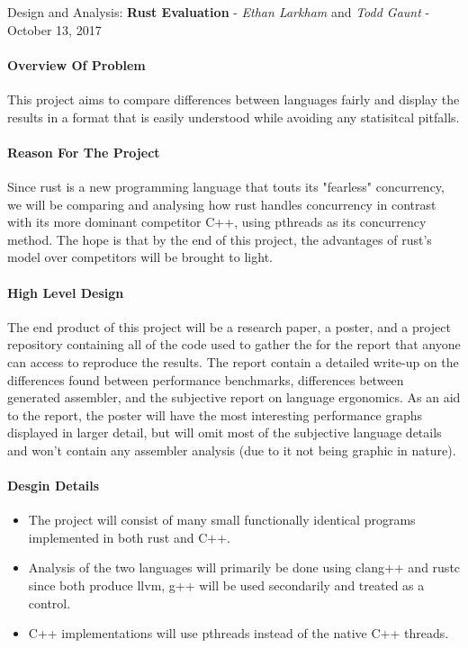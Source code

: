 \documentclass[10pt,a4paper]{report}
\begin{document}
\begin{center}
	{\Large Design and Analysis: {\bfseries Rust Evaluation}}
	- {\large{\itshape Ethan Larkham} and {\itshape Todd Gaunt}}
	- {\large October 13, 2017}
\end{center}
\vspace{0.5em}
\paragraph{Overview Of Problem}
This project aims to compare differences between languages fairly
and display the results in a format that is easily understood while avoiding
any statisitcal pitfalls.
\paragraph{Reason For The Project}
Since rust is a new programming language that touts its "fearless" concurrency,
we will be comparing and analysing how rust handles concurrency in contrast
with its more dominant competitor C++, using pthreads as its concurrency method.
The hope is that by the end of this project, the advantages of rust's
model over competitors will be brought to light.
\paragraph{High Level Design}
The end product of this project will be a research paper, a poster, and a
project repository containing all of the code used to gather the for the report
that anyone can access to reproduce the results. The report contain a detailed
write-up on the differences found between performance benchmarks, differences
between generated assembler, and the subjective report on language ergonomics.
As an aid to the report, the poster will have the most interesting performance
graphs displayed in larger detail, but will omit most of the subjective
language details and won't contain any assembler analysis (due to it not being
graphic in nature).
\paragraph{Desgin Details}
\begin{flushleft}
	\begin{itemize}
		\item The project will consist of many small functionally
			identical programs implemented in both rust and C++.
		\item Analysis of the two languages will primarily be done using clang++
			and rustc since both produce llvm, g++ will be used secondarily and
			treated as a control.
		\item C++ implementations will use pthreads instead of the native C++
			threads.
	\end{itemize}
\end{flushleft}
\end{document}
